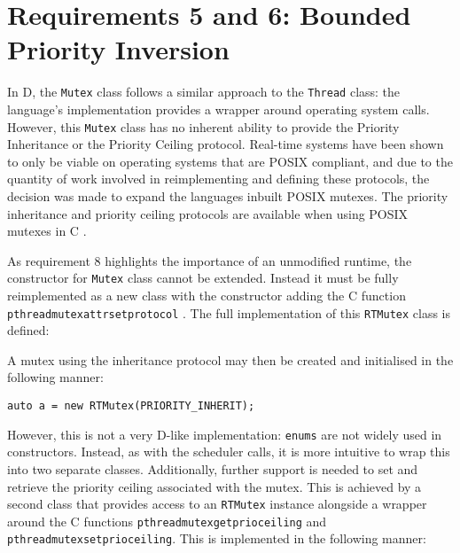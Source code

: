 \section{Requirements 5 and 6: Bounded Priority Inversion}
In D, the \texttt{Mutex} class follows a similar approach to the \texttt{Thread}
class: the language's implementation provides a wrapper around operating system 
calls. However, this \texttt{Mutex} class has no 
inherent ability to provide the Priority Inheritance or the Priority Ceiling protocol. 
Real-time systems have been shown to only be viable on operating systems that 
are POSIX compliant, and due to the quantity of work involved in reimplementing 
and defining these protocols, the decision was made to expand the languages
inbuilt POSIX mutexes. The priority inheritance and priority ceiling protocols 
are available when using POSIX mutexes in C \cite{mutex-setprotocol}. 
\par\bigskip\noindent
As requirement 8 highlights the importance of an unmodified runtime, the 
constructor for \texttt{Mutex} class cannot be extended. Instead it must be fully 
reimplemented as a new class with the constructor adding 
the C function \texttt{pthread\textunderscore{}mutexattr\textunderscore{}setprotocol} 
\cite{mutex-setprotocol}. 
The full implementation of this \texttt{RTMutex} class is defined:

A mutex using the inheritance protocol may then be created and initialised in 
the following manner: 
\begin{lstlisting}[basicstyle=\small]
auto a = new RTMutex(PRIORITY_INHERIT);
\end{lstlisting}
However, this is not a very D-like implementation: \texttt{enums} are not widely used 
in constructors. Instead, as with the scheduler calls, 
it is more intuitive to wrap this into two separate classes. Additionally, 
further support 
is needed to set and retrieve the priority ceiling associated with the 
mutex. 
This is achieved by a second class that provides access to an \texttt{RTMutex}
instance alongside a wrapper around the C functions 
\texttt{pthread\textunderscore{}mutex\textunderscore{}getprioceiling} and 
\texttt{pthread\textunderscore{}mutex\textunderscore{}setprioceiling}.
This is implemented in the following manner: 
